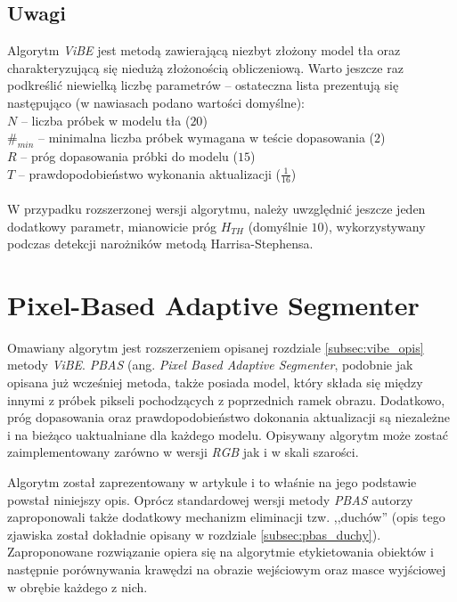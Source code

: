 \subsection{Uwagi}
\label{subsec:vibe_uwagi}

Algorytm \textit{ViBE} jest metodą zawierającą niezbyt złożony model tła oraz charakteryzującą się niedużą złożonością obliczeniową. 
Warto jeszcze raz podkreślić niewielką liczbę parametrów -- ostateczna lista prezentują się następująco (w nawiasach podano wartości domyślne):\\
\-\hspace{1cm} $N$ -- liczba próbek w modelu tła ($20$)\\
\-\hspace{1cm} $\#_{min}$ -- minimalna liczba próbek wymagana w teście dopasowania ($2$)\\
\-\hspace{1cm} $R$ -- próg dopasowania próbki do modelu ($15$) \\
\-\hspace{1cm} $T$ -- prawdopodobieństwo wykonania aktualizacji ($\frac{1}{16}$)\\
\\
\noindent W przypadku rozszerzonej wersji algorytmu, należy uwzględnić jeszcze jeden dodatkowy parametr, mianowicie próg $H_{TH}$ (domyślnie $10$), wykorzystywany podczas detekcji narożników metodą Harrisa-Stephensa.
    

\section{Pixel-Based Adaptive Segmenter}
\label{sec:pbas_teoria}

Omawiany algorytm jest rozszerzeniem opisanej rozdziale \ref{subsec:vibe_opis} metody \textit{ViBE}. 
\textit{PBAS} (ang. \textit{Pixel Based Adaptive Segmenter}, podobnie jak opisana już wcześniej metoda, także posiada model, który składa się między innymi z próbek pikseli pochodzących z poprzednich ramek obrazu. 
Dodatkowo, próg dopasowania oraz prawdopodobieństwo dokonania aktualizacji są niezależne i na bieżąco uaktualniane dla każdego modelu. 
Opisywany algorytm może zostać zaimplementowany zarówno w wersji \textit{RGB} jak i w skali szarości.

Algorytm został zaprezentowany w artykule \cite{kryjak_14_pbas} i to właśnie na jego podstawie powstał niniejszy opis. 
Oprócz standardowej wersji metody \textit{PBAS} autorzy zaproponowali także dodatkowy mechanizm eliminacji tzw. ,,duchów'' (opis tego zjawiska został dokładnie opisany w rozdziale \ref{subsec:pbas_duchy}). 
Zaproponowane rozwiązanie opiera się na algorytmie etykietowania obiektów i następnie porównywania krawędzi na obrazie wejściowym oraz masce wyjściowej w obrębie każdego z nich.


